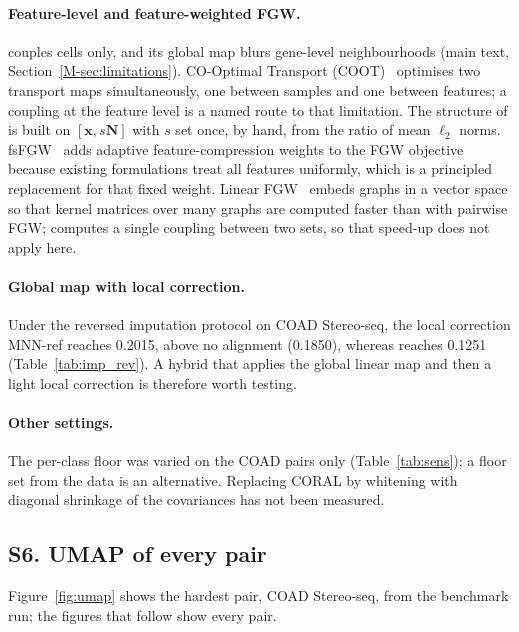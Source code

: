 \paragraph{Feature-level and feature-weighted FGW.} \frost couples cells only, and its global map blurs gene-level
neighbourhoods (main text, Section~\ref{M-sec:limitations}). CO-Optimal Transport (COOT)~\citep{redko2020coot} optimises two transport
maps simultaneously, one between samples and one between features; a coupling at the feature level is a named route
to that limitation. The structure of \frost is built on $[\mathbf{x},s\mathbf{N}]$ with $s$ set once, by hand, from
the ratio of mean $\ell_2$ norms. fsFGW~\citep{lee2026fsfgw} adds adaptive feature-compression weights to the FGW
objective because existing formulations treat all features uniformly, which is a principled replacement for that
fixed weight. Linear FGW~\citep{nguyen2022linearfgw} embeds graphs in a vector space so that kernel matrices over
many graphs are computed faster than with pairwise FGW; \frost computes a single coupling between two sets, so that
speed-up does not apply here.

\paragraph{Global map with local correction.} Under the reversed imputation protocol on COAD Stereo-seq, the local
correction MNN-ref reaches 0.2015, above no alignment (0.1850), whereas \frost reaches 0.1251 (Table~\ref{tab:imp_rev}).
A hybrid that applies the global linear map and then a light local correction is therefore worth testing.

\paragraph{Other settings.} The per-class floor was varied on the COAD pairs only (Table~\ref{tab:sens}); a floor
set from the data is an alternative. Replacing CORAL by whitening with diagonal shrinkage of the covariances has not
been measured.

\subsection*{S6. UMAP of every pair}\label{sec:supp_umap}
Figure~\ref{fig:umap} shows the hardest pair, COAD Stereo-seq, from the benchmark run; the figures that follow show
every pair.

